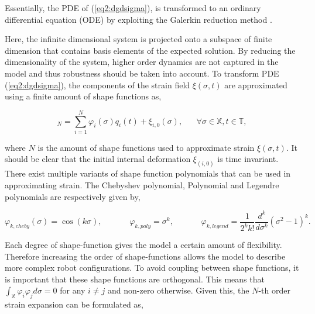 Essentially, the PDE of (\ref{eq2:dgdsigma}), is transformed to an ordinary differential equation (ODE) by exploiting the Galerkin reduction method \cite{Galerkin}.



Here, the infinite dimensional system is projected onto a subspace of finite dimension that contains basis elements of the expected solution. By reducing the dimensionality of the system, higher order dynamics are not captured in the model and thus robustness should be taken into account. To transform PDE (\ref{eq2:dgdsigma}), the components of the strain field $\xi(\sigma,t)$ are approximated using a finite amount of shape functions as,

\begin{equation}
    [\xi_i(\sigma,t)]_N = \sum_{i=1}^N \varphi_i(\sigma)q_i(t) + \xi_{i,0}(\sigma), \hspace{20pt} \forall \sigma \in \mathbb{X}, t \in \mathbb{T},
    \label{eq2:strainapprox}
\end{equation}

where $N$ is the amount of shape functions used to approximate strain $\xi(\sigma,t)$. It should be clear that the initial internal deformation $\xi_{(i,0)}$ is time invariant. There exist multiple variants of shape function polynomials that can be used in approximating strain. The Chebyshev polynomial, Polynomial and Legendre polynomials are respectively given by,

\begin{equation}
    \varphi_{k,cheby}(\sigma) = \cos(k \sigma), \hspace{40pt} \varphi_{k,poly} = \sigma^k, \hspace{40pt} \varphi_{k,legend} = \frac{1}{2^k k!} \frac{d^k}{d\sigma^k}(\sigma^2-1)^k.
    \label{eq2:shapefunction}
\end{equation}


Each degree of shape-function gives the model a certain amount of flexibility. Therefore increasing the order of shape-functions allows the model to describe more complex robot configurations. To avoid coupling between shape functions,  it is important that these shape functions are orthogonal. This means that $\int_\mathbb{X} \varphi_i \varphi_j d \sigma = 0$ for any $i \neq j$ and non-zero otherwise. Given this, the $N$-th order strain expansion can be formulated as,



